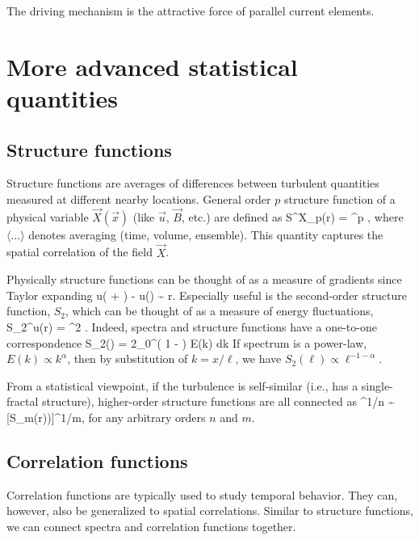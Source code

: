 \documentclass[usenatbib,twocolumn]{aastex63}
\begin{document}
The driving mechanism is the attractive force of parallel current elements.


\section{More advanced statistical quantities}\label{sect:adv_stat}

\subsection{Structure functions}

Structure functions are averages of differences between turbulent quantities measured at different nearby locations.
General order $p$ structure function of a physical variable $\vec{X}(\vec{x})$ (like $\vec{u}$, $\vec{B}$, etc.) are defined as
\be
S^X_p(r) = ^p \rangle,
\ee
where $\langle \ldots \rangle$ denotes averaging (time, volume, ensemble). %
This quantity captures the spatial correlation of the field $\vec{X}$.

Physically structure functions can be thought of as a measure of gradients since Taylor expanding
\be
u( + ) - u() \sim {} r.
\ee
Especially useful is the second-order structure function, $S_2$, which can be thought of as a measure of energy fluctuations,
\be
S_2^u(r) = ^2 \rangle.
\ee
Indeed, spectra and structure functions have a one-to-one correspondence
\be
S_2(\ell) = 2\int_0^\infty \left( 1 - \right) E(k) dk
\ee
If spectrum is a power-law, $E(k) \propto k^\alpha$, then by substitution of $k = x/\ell$, we have $S_2(\ell) \propto \ell^{-1-\alpha}$.

From a statistical viewpoint, if the turbulence is self-similar (i.e., has a single-fractal structure), higher-order structure functions are all connected as 
\be
[S_n(r))]^{1/n} \sim [S_m(r))]^{1/m},
\ee
for any arbitrary orders $n$ and $m$.

\subsection{Correlation functions}

Correlation functions are typically used to study temporal behavior.
They can, however, also be generalized to spatial correlations.
Similar to structure functions, we can connect spectra and correlation functions together.
\end{document}
